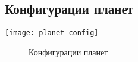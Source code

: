 \subsection{Конфигурации планет}
\begin{center}
\texttt{[image: planet-config]}
\begin{figure}[h!]
\caption{Конфигурации планет}
\end{figure}
\end{center}